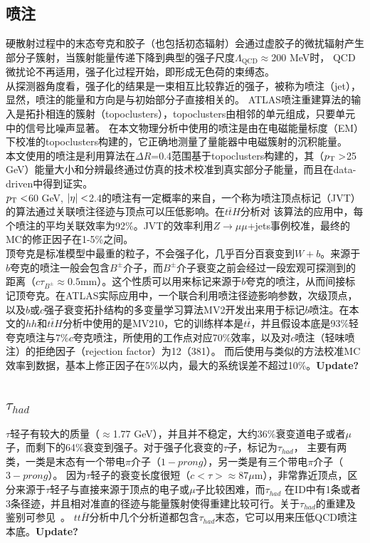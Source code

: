 \subsection{喷注}\label{subsec:jet_reco}
硬散射过程中的末态夸克和胶子（也包括初态辐射）会通过虚胶子的微扰辐射产生部分子簇射，当簇射能量传递下降到典型的强子尺度$\Lambda_{\text{QCD}}\approx$200 MeV时，
QCD微扰论不再适用，强子化过程开始，即形成无色荷的束缚态。\\
从探测器角度看，强子化的结果是一束相互比较靠近的强子，被称为喷注（jet），显然，喷注的能量和方向是与初始部分子直接相关的。
ATLAS喷注重建算法的输入是拓扑相连的簇射（topoclusters），topoclusters由相邻的单元组成，只要单元中的信号比噪声显著\cite{Aad:2016upy}。 
在本文物理分析中使用的喷注是由在电磁能量标度（EM）下校准的topoclusters构建的，它正确地测量了量能器中电磁簇射的沉积能量\cite{ATLAS-CONF-2013-004}。\\
本文使用的喷注是利用\antikt 算法\cite{Cacciari:2008gp}在$\Delta R$=0.4范围基于topoclusters构建的，其（$p_{\text{T}}>$25 GeV）能量大小和分辨最终通过仿真的技术校准到真实部分子能量，而且在data-driven中得到证实\cite{TheATLAScollaboration:2015soq,TheATLAScollaboration:2013pia}。\\
$p_{\text{T}}<$60 GeV, $|\eta|<$2.4的喷注有一定概率的来自\pileup ，一个称为喷注顶点标记（JVT）\cite{ATLAS:2014cva}的算法通过关联喷注径迹与顶点可以压低\pileup 影响。在$t\bar{t}H$分析对
该算法的应用中，每个喷注的平均关联效率为92\%。JVT的效率利用$Z\rightarrow \mu\mu$+jets事例校准，最终的MC的修正因子在1-5\%之间。\\
顶夸克是标准模型中最重的粒子，不会强子化，几乎百分百衰变到$W+b$。来源于$b$夸克的喷注一般会包含$B^{\pm}$介子，而$B^{\pm}$介子衰变之前会经过一段宏观可探测到的距离（$c\tau_{B^{\pm}}\approx0.5\text{mm}$）。这个性质可以用来标记来源于$b$夸克的喷注，从而间接标记顶夸克。在ATLAS实际应用中，一个联合利用喷注径迹影响参数，次级顶点，
以及$b$或$c$强子衰变拓扑结构的多变量学习算法MV2\cite{ATL-PHYS-PUB-2015-022,ATL-PHYS-PUB-2016-012}开发出来用于标记$b$喷注。在本文的$hh$和$t\bar{t}H$分析中使用的是MV210，它的训练样本是$t\bar{t}$，并且假设本底是93\%轻
夸克喷注与7\%$c$夸克喷注，所使用的工作点对应70\%\btag 效率，以及对$c$喷注（轻味喷注）的拒绝因子（rejection factor）为12（381）。
而后使用与\RunOne 类似的方法\cite{Aad:2015ydr}校准MC\btag 效率到数据，基本上修正因子在5\%以内，最大的系统误差不超过10\%。\textbf{Update?}

\subsection{$\tau_{had}$}
$\tau$轻子有较大的质量（$\approx$1.77 GeV），并且并不稳定，大约36\%衰变道电子或者$\mu$子，而剩下的64\%衰变到强子。对于强子化衰变的$\tau$子，标记为$\tau_{had}$，
主要有两类，一类是末态有一个带电$\pi$介子（$1-prong$），另一类是有三个带电$\pi$介子（$3-prong$）。
因为$\tau$轻子的衰变长度很短（$c<\tau>\approx87\mu$m），非常靠近顶点，区分来源于$\tau$轻子与直接来源于顶点的电子或$\mu$子比较困难，而$\tau_{had}$
在ID中有1条或者3条径迹，并且相对准直的径迹与能量簇射使得重建比较可行。关于$\tau_{had}$的重建及鉴别可参见~\cite{ATL-PHYS-PUB-2015-045}。
$tt\bar{H}$分析中几个分析道都包含$\tau_{had}$末态，它可以用来压低QCD喷注本底。\textbf{Update?}

